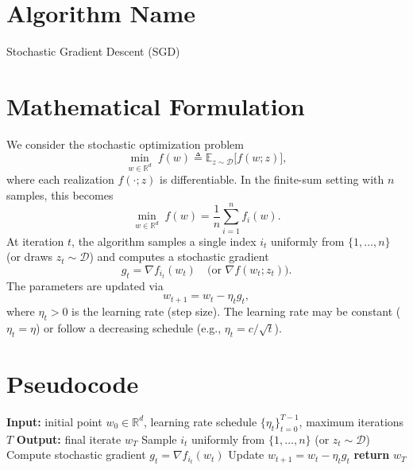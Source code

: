 \documentclass{article}
\begin{document}
\section*{Algorithm Name}
Stochastic Gradient Descent (SGD)

\section*{Mathematical Formulation}
We consider the stochastic optimization problem
\begin{equation}
    \min_{w \in \mathbb{R}^d} \; f(w) \triangleq \mathbb{E}_{z \sim \mathcal{D}} \bigl[ f(w; z) \bigr],
\end{equation}
where each realization $f(\cdot; z)$ is differentiable. In the finite-sum setting with $n$ samples, this becomes
\begin{equation}
    \min_{w \in \mathbb{R}^d} \; f(w) = \frac{1}{n} \sum_{i=1}^n f_i(w).
\end{equation}
At iteration $t$, the algorithm samples a single index $i_t$ uniformly from $\{1,\dots,n\}$ (or draws $z_t \sim \mathcal{D}$) and computes a stochastic gradient
\begin{equation}
    g_t = \nabla f_{i_t}(w_t) \quad \bigl(\text{or } \nabla f(w_t; z_t)\bigr).
\end{equation}
The parameters are updated via
\begin{equation}
    w_{t+1} = w_t - \eta_t g_t,
\end{equation}
where $\eta_t > 0$ is the learning rate (step size). The learning rate may be constant ($\eta_t = \eta$) or follow a decreasing schedule (e.g., $\eta_t = c/\sqrt{t}$).

\section*{Pseudocode}
\begin{algorithm}[H]
\caption{Stochastic Gradient Descent}
\begin{algorithmic}
\STATE \textbf{Input:} initial point $w_0 \in \mathbb{R}^d$, learning rate schedule $\{\eta_t\}_{t=0}^{T-1}$, maximum iterations $T$
\STATE \textbf{Output:} final iterate $w_T$
    \STATE Sample $i_t$ uniformly from $\{1,\dots,n\}$ (or $z_t \sim \mathcal{D}$)
    \STATE Compute stochastic gradient $g_t = \nabla f_{i_t}(w_t)$
    \STATE Update $w_{t+1} = w_t - \eta_t g_t$
\ENDFOR
\STATE \textbf{return} $w_T$
\end{algorithmic}
\end{algorithm}
\end{document}

